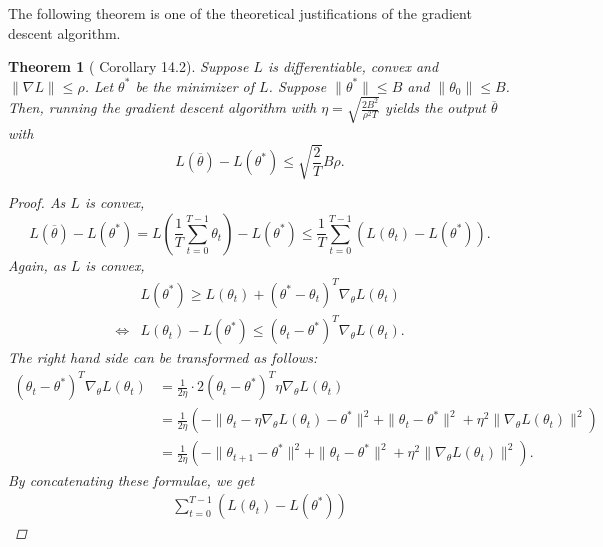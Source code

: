 \documentclass{amsart}
\newtheorem{theorem}{Theorem}[section]
\theoremstyle{definition}
\theoremstyle{remark}
\numberwithin{equation}{section}
\begin{document}
The following theorem is one of the theoretical justifications of the gradient descent algorithm.

\begin{theorem}[\cite{shalev2014understanding} Corollary 14.2]
Suppose $L$ is differentiable, convex and $\|\nabla L \| \leq \rho$.
Let $\theta^{\ast}$ be the minimizer of $L$.
Suppose $\| \theta^{\ast} \| \leq B$ and $\| \theta_{0} \| \leq B$. Then, running the gradient descent algorithm with $\eta = \sqrt{\frac{2B^2}{\rho^2 T}}$ yields the output $\overline{\theta}$ with
\begin{equation}
L(\overline{\theta}) - L(\theta^{\ast}) \leq \sqrt{\frac{2}{T}}B\rho.
\end{equation}
\begin{proof}
As $L$ is convex,
\begin{equation}\label{eq1}
L(\overline{\theta}) - L(\theta^{\ast}) = L\left(\frac{1}{T} \sum_{t=0}^{T-1} \theta_t\right) - L(\theta^{\ast}) \leq \frac{1}{T} \sum_{t=0}^{T-1} \left( L(\theta_t) - L(\theta^{\ast}) \right).
\end{equation}
Again, as $L$ is convex,
\begin{equation}
\begin{split}
& L(\theta^{\ast}) \geq L(\theta_t) + (\theta^\ast - \theta_t)^T \nabla_{\theta} L(\theta_t)\\
\Leftrightarrow & L(\theta_t) - L(\theta^\ast) \leq (\theta_t - \theta^{\ast})^T \nabla_{\theta} L(\theta_t).
\end{split}
\end{equation}
The right hand side can be transformed as follows:
\begin{equation}
\begin{split}
(\theta_t - \theta^{\ast})^T \nabla_{\theta} L(\theta_t)
&= \frac{1}{2\eta} \cdot 2(\theta_t - \theta^{\ast})^T \eta\nabla_{\theta}L(\theta_t)\\
&= \frac{1}{2\eta} \left( -\|\theta_t - \eta\nabla_{\theta}L(\theta_t) - \theta^{\ast}\|^2 + \|\theta_t - \theta^{\ast}\|^2 + \eta^2 \|\nabla_{\theta}L(\theta_t)\|^2 \right)\\
&= \frac{1}{2\eta} \left( -\|\theta_{t+1} - \theta^{\ast}\|^2 + \|\theta_t - \theta^{\ast}\|^2 + \eta^2 \|\nabla_{\theta}L(\theta_t)\|^2\right).
\end{split}
\end{equation}
By concatenating these formulae, we get
\begin{equation}\label{eq3}
\begin{split}
\sum_{t=0}^{T-1} \left( L(\theta_t) - L(\theta^{\ast}) \right)

\end{split}
\end{equation}
\end{proof}
\end{theorem}
\end{document}
